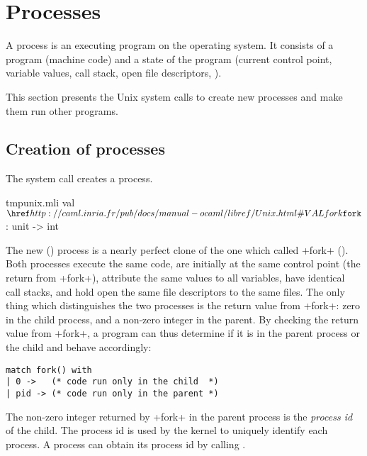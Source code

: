 %
%

\chapter{Processes}
\label{sec/processes}

A process is an executing program on the operating system.  It
consists of a program (machine code) and a state of the program
(current control point, variable values, call stack, open file
descriptors, \etc).

This section presents the Unix system calls to create new processes
and make them run other programs.

\section{Creation of processes}

The system call  creates a process.
%
\begin{listingcodefile}{tmpunix.mli}
val $\libvalue{Unix}{fork}$ : unit -> int
\end{listingcodefile}
%
The new () process is a nearly perfect clone of the
one which called \ml+fork+ ().  Both processes execute
the same code, are initially at the same control point (the return
from \ml+fork+), attribute the same values to all variables, have
identical call stacks, and hold open the same file descriptors to
the same files.  The only thing which distinguishes the two processes
is the return value from \ml+fork+: zero in the child process,
and a non-zero integer in the parent.  By checking the return value
from \ml+fork+, a program can thus determine if it is in the parent
process or the child and behave accordingly: 
%
\begin{lstlisting}
match fork() with
| 0 ->   (* code run only in the child  *)
| pid -> (* code run only in the parent *)
\end{lstlisting}
%
The non-zero integer returned by \ml+fork+ in the parent process
is the \emph{process id} of the child.  The process id is used by
the kernel to uniquely identify each process.  A process can obtain
its process id by calling .

